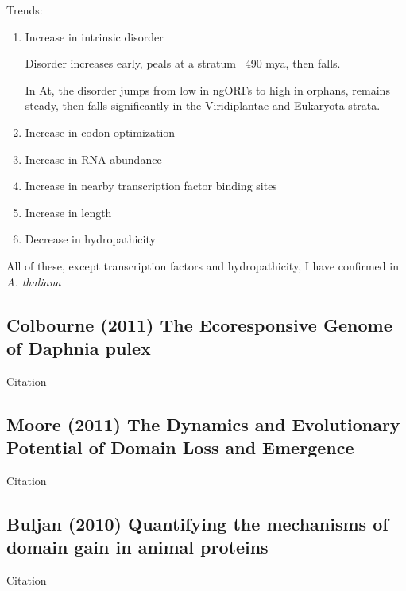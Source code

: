 
    Trends:

    \begin{enumerate}
        
        \item Increase in intrinsic disorder

        Disorder increases early, peals at a stratum ~490 mya, then falls.

        In At, the disorder jumps from low in ngORFs to high in orphans,
        remains steady, then falls significantly in the Viridiplantae and
        Eukaryota strata.

        \item Increase in codon optimization \item Increase in RNA abundance
    \item Increase in nearby transcription factor binding sites \item
    Increase in length \item Decrease in hydropathicity \end{enumerate}

    All of these, except transcription factors and hydropathicity, I have
    confirmed in \textit{A. thaliana}


\subsection{Colbourne (2011) The Ecoresponsive Genome of Daphnia pulex}

    Citation \cite{colbourne_ecoresponsive_2011}


\subsection{Moore (2011) The Dynamics and Evolutionary Potential of Domain
Loss and Emergence}

    Citation \cite{moore_dynamics_2011}


\subsection{Buljan (2010) Quantifying the mechanisms of domain gain in animal proteins}
    Citation \cite{buljan_quantifying_2010}

